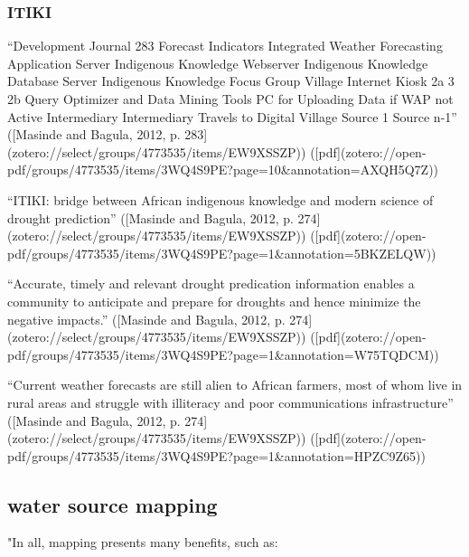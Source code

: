 {\subsubsection{ITIKI}
“Development Journal 283 Forecast Indicators Integrated Weather Forecasting Application Server Indigenous Knowledge Webserver Indigenous Knowledge Database Server Indigenous Knowledge Focus Group Village Internet Kiosk 2a 3 2b Query Optimizer and Data Mining Tools PC for Uploading Data if WAP not Active Intermediary Intermediary Travels to Digital Village Source 1 Source n-1” ([Masinde and Bagula, 2012, p. 283](zotero://select/groups/4773535/items/EW9XSSZP)) ([pdf](zotero://open-pdf/groups/4773535/items/3WQ4S9PE?page=10&annotation=AXQH5Q7Z))

“ITIKI: bridge between African indigenous knowledge and modern science of drought prediction” ([Masinde and Bagula, 2012, p. 274](zotero://select/groups/4773535/items/EW9XSSZP)) ([pdf](zotero://open-pdf/groups/4773535/items/3WQ4S9PE?page=1&annotation=5BKZELQW))

“Accurate, timely and relevant drought predication information enables a community to anticipate and prepare for droughts and hence minimize the negative impacts.” ([Masinde and Bagula, 2012, p. 274](zotero://select/groups/4773535/items/EW9XSSZP)) ([pdf](zotero://open-pdf/groups/4773535/items/3WQ4S9PE?page=1&annotation=W75TQDCM))

“Current weather forecasts are still alien to African farmers, most of whom live in rural areas and struggle with illiteracy and poor communications infrastructure” ([Masinde and Bagula, 2012, p. 274](zotero://select/groups/4773535/items/EW9XSSZP)) ([pdf](zotero://open-pdf/groups/4773535/items/3WQ4S9PE?page=1&annotation=HPZC9Z65))


\subsection{water source mapping}
"In all, mapping presents many benefits, such as:

}
